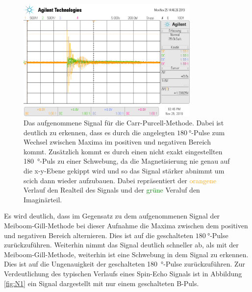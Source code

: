 \begin{figure}[H]
  \centering
  \includegraphics[width=0.8\textwidth]{../data/scope_76.png}
  \caption{Das aufgenommene Signal für die Carr-Purcell-Methode. Dabei ist deutlich zu erkennen, dass es durch die angelegten
  $\SI{180}{\degree}$-Pulse zum Wechsel zwischen Maxima im positiven und negativen Bereich kommt. Zusätzlich kommt es durch einen nicht exakt eingestellten \SI{180}{\degree}-Puls zu einer Schwebung, da die Magnetisierung nie genau auf die x-y-Ebene gekippt wird und so das Signal stärker abnimmt um scich dann wieder aufzubauen. Dabei repräsentiert der \textcolor{orange}{orangene} Verlauf den Realteil des Signals und der \textcolor{green}{grüne} Veraluf den Imaginärteil.}
  \label{fig:t2_off}
\end{figure} \noindent
Es wird deutlich, dass im Gegensatz zu dem aufgenommenen Signal der Meiboom-Gill-Methode bei dieser Aufnahme die Maxima zwischen
dem positiven und negativen Bereich alternieren. Dies ist auf die geschalteten $\SI{180}{\degree}$-Pulse zurückzuführen.
Weiterhin nimmt das Signal deutlich schneller ab, als mit der Meiboom-Gill-Methode, weiterhin ist eine Schwebung in dem Signal zu erkennen. Dies ist auf die Ungenauigkeit der geschalteten \SI{180}{\degree}-Pulse zurückzuführen.
Zur Verdeutlichung des typischen Verlaufs eines Spin-Echo Signals ist in Abbildung \ref{fig:N1} ein Signal dargestellt mit nur einem
geschalteten B-Puls.
